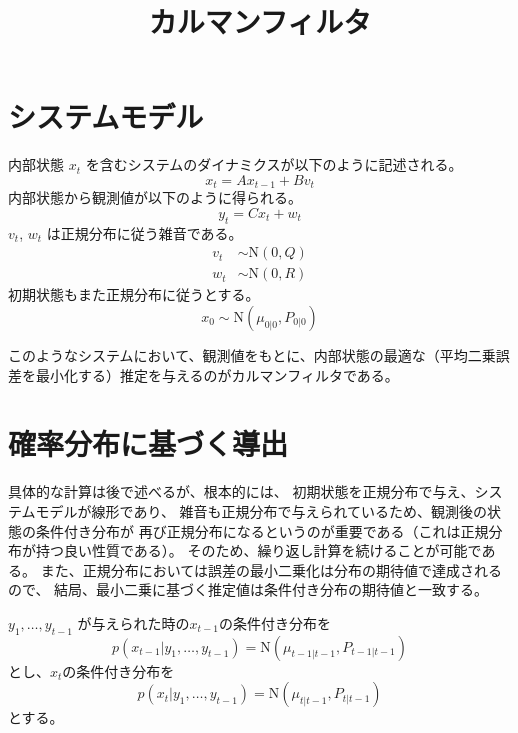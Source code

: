 \documentclass[textwidth-limit=45]{bxjsarticle}
\begin{document}
\title{カルマンフィルタ}
\maketitle

\section{システムモデル}
内部状態 $x_t$ を含むシステムのダイナミクスが以下のように記述される。
\begin{equation}
  \label{sys_update}
  x_t = A x_{t-1} + B v_t
\end{equation}
内部状態から観測値が以下のように得られる。
\begin{equation}
  \label{observation}
  y_t = C x_t + w_t
\end{equation}  
$v_t$, $w_t$ は正規分布に従う雑音である。
\begin{align}
  v_t &\sim \mathrm N(0, Q) \\
  w_t &\sim \mathrm N(0, R)
\end{align}
初期状態もまた正規分布に従うとする。
\begin{equation}
  x_0 \sim \mathrm N(\mu_{0|0}, P_{0|0})
\end{equation}

このようなシステムにおいて、観測値をもとに、内部状態の最適な（平均二乗誤差を最小化する）推定を与えるのがカルマンフィルタである。

\section{確率分布に基づく導出}
具体的な計算は後で述べるが、根本的には、
初期状態を正規分布で与え、システムモデルが線形であり、
雑音も正規分布で与えられているため、観測後の状態の条件付き分布が
再び正規分布になるというのが重要である（これは正規分布が持つ良い性質である）。
そのため、繰り返し計算を続けることが可能である。
また、正規分布においては誤差の最小二乗化は分布の期待値で達成されるので、
結局、最小二乗に基づく推定値は条件付き分布の期待値と一致する。

$y_1, \dots, y_{t-1}$ が与えられた時の$x_{t-1}$の条件付き分布を
\begin{equation}
  p(x_{t-1}|y_1, \dots, y_{t-1}) = \mathrm N(\mu_{t-1|t-1}, P_{t-1|t-1})
\end{equation}
とし、$x_t$の条件付き分布を
\begin{equation}
  p(x_{t}|y_1, \dots, y_{t-1}) = \mathrm N(\mu_{t|t-1}, P_{t|t-1})
\end{equation}
とする。
\end{document}
